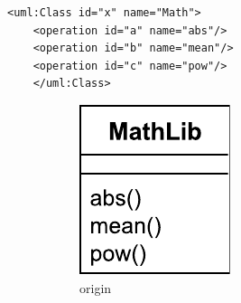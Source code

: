 \documentclass{jot}
\begin{document}
\vspace{-15pt}
\begin{minipage}[t]{0.61\linewidth} 
    \centering
    \begin{lstlisting}[style=eol,caption={The simplified XMI of the model in Fig. \ref{fig:origin}.},label=lst:originxmi]
    <uml:Class id="x" name="Math">
    <operation id="a" name="abs"/>
    <operation id="b" name="mean"/>
    <operation id="c" name="pow"/>
    </uml:Class>
    \end{lstlisting}
    \vspace{-10pt}
    \begin{figure}[H]
        \centering    
        \hfill
        \begin{subfigure}[t]{0.2\linewidth}
            \centering
            \includegraphics[width=\linewidth]{OriginalClassDiagram}
            \caption{origin}
            \label{fig:origin}
        \end{subfigure}
        \hfill
        \begin{subfigure}[t]{0.2\linewidth}
            \centering

\end{subfigure}
\end{figure}
\end{minipage}
\end{document}
